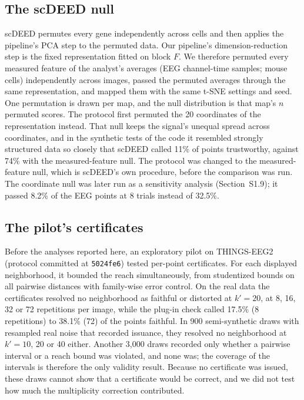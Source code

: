 \documentclass[11pt]{article}
\newcommand{\BmSCDPass}{32.5}
\newcommand{\BmSCDAltPass}{8.2}
\newcommand{\CertDraws}{900}
\newcommand{\CertValidityDraws}{3{,}000}
\begin{document}
\subsection{The scDEED null}
scDEED \citep{xia2024} permutes every gene independently across cells and then applies the pipeline's PCA step to the permuted data.
Our pipeline's dimension-reduction step is the fixed representation fitted on block $F$.
We therefore permuted every measured feature of the analyst's averages (EEG channel-time samples; mouse cells) independently across images, passed the permuted averages through the same representation, and mapped them with the same t-SNE settings and seed.
One permutation is drawn per map, and the null distribution is that map's $n$ permuted scores.
The protocol first permuted the 20 coordinates of the representation instead.
That null keeps the signal's unequal spread across coordinates, and in the synthetic tests of the code it resembled strongly structured data so closely that scDEED called 11\% of points trustworthy, against 74\% with the measured-feature null.
The protocol was changed to the measured-feature null, which is scDEED's own procedure, before the comparison was run.
The coordinate null was later run as a sensitivity analysis (Section~S1.9); it passed \BmSCDAltPass\% of the EEG points at 8 trials instead of \BmSCDPass\%.

\subsection{The pilot's certificates}
Before the analyses reported here, an exploratory pilot on THINGS-EEG2 (protocol committed at \texttt{5024fe6}) tested per-point certificates.
For each displayed neighborhood, it bounded the reach simultaneously, from studentized bounds on all pairwise distances with family-wise error control.
On the real data the certificates resolved no neighborhood as faithful or distorted at $k'=20$, at 8, 16, 32 or 72 repetitions per image, while the plug-in check called 17.5\% (8 repetitions) to 38.1\% (72) of the points faithful.
In \CertDraws{} semi-synthetic draws with resampled real noise that recorded issuance, they resolved no neighborhood at $k'=10$, 20 or 40 either.
Another \CertValidityDraws{} draws recorded only whether a pairwise interval or a reach bound was violated, and none was; the coverage of the intervals is therefore the only validity result.
Because no certificate was issued, these draws cannot show that a certificate would be correct, and we did not test how much the multiplicity correction contributed.
\end{document}
